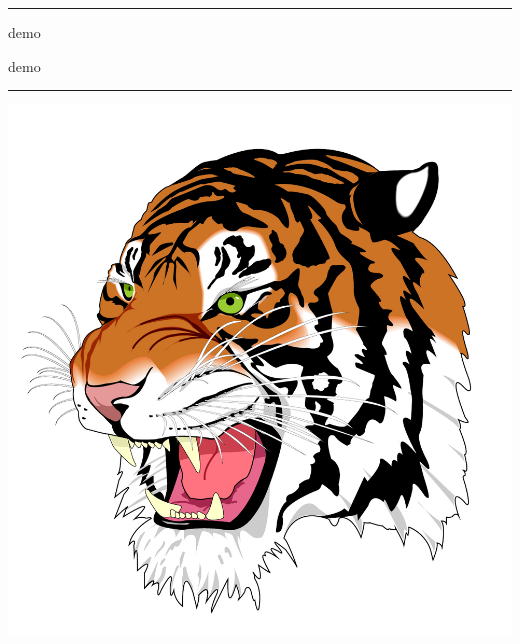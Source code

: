 \documentclass[a4paper,demo,\myClassOptions]{article}
\begin{document}
\hrule
\begin{description}
  \Large
  \item[graphicx:] demo
  \item[pdfpages:] demo
\end{description}
\hrule

\tableofcontents
\includegraphics[scale=.4]{pdf/tiger.pdf}


\end{document}

